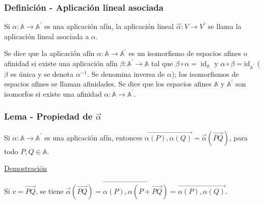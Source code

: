 \documentclass[12pt, a4paper, ones, notitlepage, openany,titlepage]{article}
\newcommand{\demostracion}{\noindent\underline{Demostración}}
\begin{document}
\subsubsection{Definición - Aplicación lineal asociada} Si $\alpha: \mathbb{A} \rightarrow \mathbb{A}^{\prime}$ es una aplicación afín, la aplicación lineal $\overrightarrow{\alpha}: V \rightarrow V^{\prime}$ se llama la aplicación lineal asociada a $\alpha$.

Se dice que la aplicación afín $\alpha: \mathbb{A} \rightarrow \mathbb{A}^{\prime}$ es un isomorfismo de espacios afines o afinidad si existe una aplicación afín $\beta: \mathbb{A}^{\prime} \rightarrow \mathbb{A}$ tal que $\beta \circ \alpha=\operatorname{id}_{\mathbb{A}}$ y $\alpha \circ \beta=\mathrm{id}_{\mathbb{A}^{\prime}}$ ($\beta$ es única y se denota $\alpha^{-1}$. Se denomina inversa de $\alpha$); los isomorfismos de espacios afines se llaman afinidades. Se dice que los espacios afines $\mathbb{A}$ y $\mathbb{A}^{\prime}$ son isomorfos si existe una afinidad $\alpha: \mathbb{A} \rightarrow \mathbb{A}^{\prime}$.\\

\subsubsection{Lema - Propiedad de $\overrightarrow{\alpha}$}
\noindent Si $\alpha: \mathbb{A} \rightarrow \mathbb{A}^{\prime}$ es una aplicación afín, entonces $\overrightarrow{\alpha(P), \alpha(Q)}=\overrightarrow{\alpha}(\overrightarrow{P Q})$, para todo $P, Q \in \mathbb{A}$.

\demostracion

\noindent Si $v=\overrightarrow{P Q}$, se tiene $\overrightarrow{\alpha}(\overrightarrow{P Q})=\overrightarrow{\alpha(P), \alpha(P+\overrightarrow{P Q})}=\overrightarrow{\alpha(P), \alpha(Q)}$.\\
\end{document}
